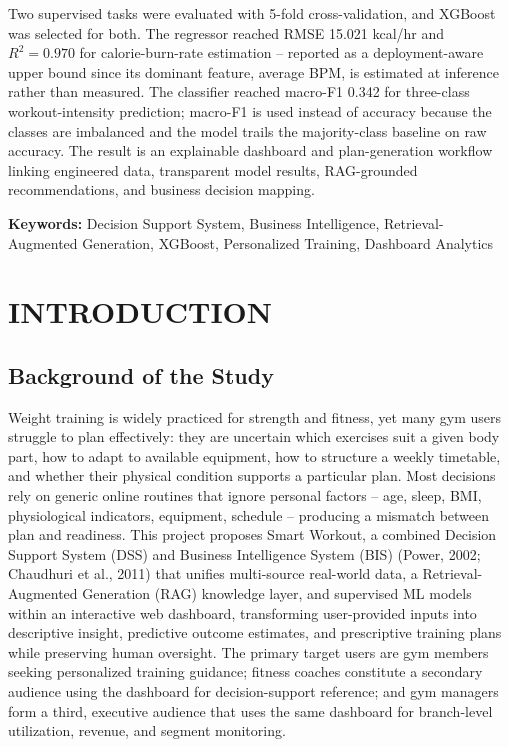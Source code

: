 \documentclass{aitthesis}
\begin{document}
Two supervised tasks were evaluated with 5-fold cross-validation, and XGBoost was selected for both. The regressor reached RMSE 15.021 kcal/hr and $R^2=0.970$ for calorie-burn-rate estimation -- reported as a deployment-aware upper bound since its dominant feature, average BPM, is estimated at inference rather than measured. The classifier reached macro-F1 0.342 for three-class workout-intensity prediction; macro-F1 is used instead of accuracy because the classes are imbalanced and the model trails the majority-class baseline on raw accuracy. The result is an explainable dashboard and plan-generation workflow linking engineered data, transparent model results, RAG-grounded recommendations, and business decision mapping.


\vspace{0.5em}
\noindent\textbf{Keywords:} Decision Support System, Business Intelligence, Retrieval-Augmented Generation, XGBoost, Personalized Training, Dashboard Analytics
\clearpage

\tableofcontents
\clearpage


\chapter{INTRODUCTION}
\section{Background of the Study}
Weight training is widely practiced for strength and fitness, yet many gym users struggle to plan effectively: they
are uncertain which exercises suit a given body part, how to adapt to available equipment, how to structure a
weekly timetable, and whether their physical condition supports a particular plan. Most decisions rely on generic
online routines that ignore personal factors -- age, sleep, BMI, physiological indicators, equipment, schedule --
producing a mismatch between plan and readiness. This project proposes Smart Workout, a combined Decision
Support System (DSS) and Business Intelligence System (BIS) (Power, 2002; Chaudhuri et al., 2011) that
unifies multi-source real-world data, a Retrieval-Augmented Generation (RAG) knowledge layer, and supervised
ML models within an interactive web dashboard, transforming user-provided inputs into descriptive insight,
predictive outcome estimates, and prescriptive training plans while preserving human oversight. The primary
target users are gym members seeking personalized training guidance; fitness coaches constitute a secondary
audience using the dashboard for decision-support reference; and gym managers form a third, executive audience
that uses the same dashboard for branch-level utilization, revenue, and segment monitoring.
\end{document}
